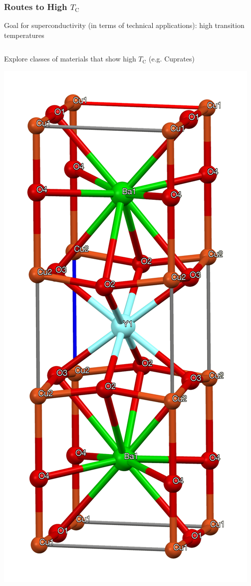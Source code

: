 \documentclass[aspectratio=169]{beamer}
\begin{document}
\begin{frame}
	\frametitle{Routes to High \(T_{\mathrm{C}}\)}
	
	Goal for superconductivity (in terms of technical applications): high transition temperatures
	\begin{columns}[T]
		\begin{column}{0.5\textwidth}
			\begin{center}
				Explore classes of materials that show high \(T_{\mathrm{C}}\) (e.g. Cuprates)
				
				\includegraphics[height=0.4\textheight]{figs/YBCO-xtal-unit-cell-3D-bs-17-atoms-labelled}
				

\end{center}
\end{column}
\end{columns}
\end{frame}
\end{document}
